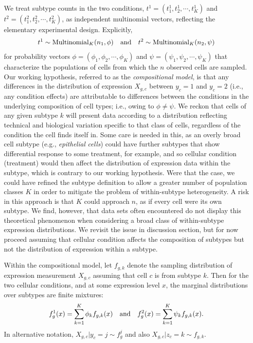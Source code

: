 \documentclass[11pt]{amsart}
\begin{document}
We treat subtype counts in the two conditions,  $t^1 = (t^1_1, t^1_2, \cdots, t^1_K )$ and 
$t^2 = (t^2_1, t^2_2, \cdots, t^2_K)$,  as independent multinomial
vectors, reflecting the elementary experimental design.  Explicitly,
\begin{eqnarray*}
t^1 \sim \text{Multinomial}_K( n_1, \phi ) \quad {\mbox {\rm and}} \quad
t^2 \sim \text{Multinomial}_K( n_2, \psi )
\end{eqnarray*}
for probability vectors 
$\phi = (\phi_1, \phi_2, \cdots, \phi_K)$ and 
 $\psi = ( \psi_1, \psi_2, \cdots, \psi_K)$ that characterize the populations of
cells from which the $n$ observed cells are sampled.  Our working hypothesis, referred to as the {\em compositional model},  is that any differences in the distribution of expression $X_{g,c}$ 
between $y_c=1$ and $y_c=2$ (i.e., any condition effects) are attributable 
to differences between the conditions 
in the underlying composition of cell types; i.e.,
owing to $\phi \neq \psi$.  We reckon that cells of any given subtype $k$ will
present data according to a distribution reflecting technical 
and biological variation specific to that class of cells, regardless of the 
condition the cell finds itself in.   Some care is needed in this, as an overly
broad cell subtype (e.g., {\em epithelial cells}) could have
further subtypes that show differential response to some treatment, for example,
and so cellular condition (treatment) would then affect the distribution of 
expression data within the subtype, which is contrary to our working hypothesis.
Were that the case,  we could have refined the subtype definition to allow a greater
number of population classes $K$ in order to mitigate the problem of within-subtype 
heterogeneity. A  risk in this approach is that $K$ could approach $n$, as if  
every cell were  its own subtype.  We find, however,
that data sets often encountered do not display this theoretical phenomenon
when considering a broad class of within-subtype expression distributions.
We revisit the issue in discussion section, but for now proceed assuming 
that cellular condition affects the composition of subtypes but not the distribution of expression
within a subtype.

Within the compositional model, let $f_{g,k}$ denote the sampling distribution
of expression measurement $X_{g,c}$ assuming that cell $c$ is from subtype $k$.
Then for the two cellular conditions, and at some expression level $x$, 
the marginal distributions over subtypes are finite mixtures:
\begin{eqnarray*}
f_g^1(x) = \sum_{k=1}^K \phi_k f_{g,k} (x) \quad {\mbox {\rm and}} \quad
f_g^2(x) = \sum_{k=1}^K \psi_k f_{g,k} (x).
\end{eqnarray*}
In alternative notation, $X_{g,c} | y_c=j  \sim f_g^j$ and also $X_{g,c} | z_c=k \sim f_{g,k}$.
\end{document}
